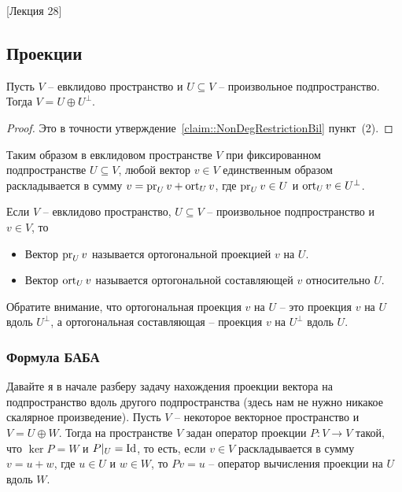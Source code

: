 [Лекция 28]


\subsection{Проекции}
\label{section::OrthoProjection}

\begin{claim}
Пусть $V$ -- евклидово пространство и $U\subseteq V$ -- произвольное подпространство.
Тогда $V = U\oplus U^\bot$.
\end{claim}
\begin{proof}
Это в точности утверждение~\ref{claim::NonDegRestrictionBil} пункт~(2).
\end{proof}

Таким образом в евклидовом пространстве $V$ при фиксированном подпространстве $U\subseteq V$, любой вектор $v\in V$ единственным образом раскладывается в сумму $v = \operatorname{pr}_U v + \operatorname{ort}_U v$, где $\operatorname{pr}_U v \in U$ и $\operatorname{ort}_U v\in U^\bot$.


\begin{definition}
Если $V$ -- евклидово пространство, $U\subseteq V$ -- произвольное подпространство и $v\in V$, то 
\begin{itemize}
\item Вектор $\operatorname{pr}_U v$ называется ортогональной проекцией $v$ на $U$.

\item Вектор $\operatorname{ort}_U v$ называется ортогональной составляющей $v$ относительно $U$.
\end{itemize}
\end{definition}

Обратите внимание, что ортогональная проекция $v$ на $U$ -- это проекция $v$ на $U$ вдоль $U^\bot$, а ортогональная составляющая -- проекция $v$ на $U^\bot$ вдоль $U$.

\subsubsection*{Формула БАБА}

Давайте я в начале разберу задачу нахождения проекции вектора на подпространство вдоль другого подпространства (здесь нам не нужно никакое скалярное произведение).
Пусть $V$ -- некоторое векторное пространство и $V = U\oplus W$.
Тогда на пространстве $V$ задан оператор проекции $P\colon V\to V$ такой, что $\ker P = W$ и $P|_U = \operatorname{Id}$, то есть, если $v\in V$ раскладывается в сумму $v = u + w$, где $u\in U$ и $w\in W$, то $Pv = u$ -- оператор вычисления проекции на $U$ вдоль $W$.


